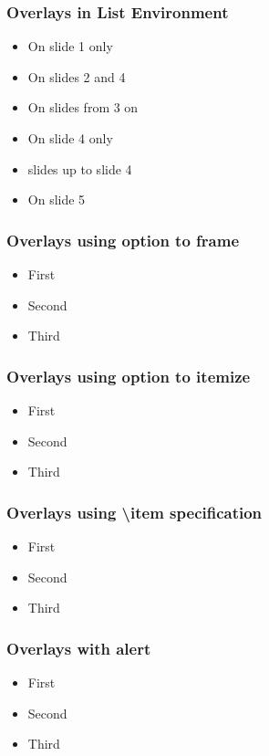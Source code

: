 \documentclass[11pt,pdf,aspectratio=43]{beamer}
\begin{document}
\begin{frame}
    \frametitle{Overlays in List Environment}
    \begin{itemize}
	\item<1> On slide 1 only
	\item<2,4> On slides 2 and 4
	\item<3-> On slides from 3 on
	\item<4> On slide 4 only
	\item<-4> slides up to slide 4
	\item<5> On slide 5
    \end{itemize}
\end{frame}


\begin{frame}[<+->]
    \frametitle{Overlays using option to frame}
    \begin{itemize}
	\item First 
	\item Second
	\item Third
    \end{itemize}
\end{frame}


\begin{frame}
    \frametitle{Overlays using option to itemize}
    \begin{itemize}[<+->]
	\item First 
	\item Second
	\item Third
    \end{itemize}
\end{frame}

\begin{frame}
    \frametitle{Overlays using \textbackslash{}item specification}
    \begin{itemize}
	\item<+-> First 
	\item<+-> Second
	\item<+-> Third
    \end{itemize}
\end{frame}

\begin{frame}
    \frametitle{Overlays with alert}
    \begin{itemize}[<+-|alert@+>]
	\item First
	\item Second
	\item Third
    \end{itemize}
\end{frame}
\end{document}
